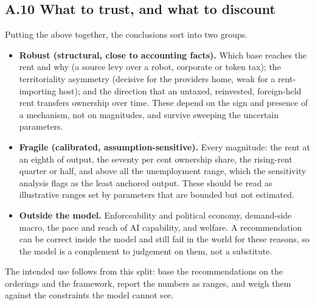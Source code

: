 \documentclass[12pt]{article}
\providecommand{\tightlist}{\setlength{\itemsep}{0pt}\setlength{\parskip}{0pt}}
\begin{document}
\hypertarget{a.10-what-to-trust-and-what-to-discount}{%
\subsection{A.10 What to trust, and what to
discount}\label{a.10-what-to-trust-and-what-to-discount}}

Putting the above together, the conclusions sort into two groups.

\begin{itemize}
\tightlist
\item
  \textbf{Robust (structural, close to accounting facts).} Which base
  reaches the rent and why (a source levy over a robot, corporate or
  token tax); the territoriality asymmetry (decisive for the
  provider\textquotesingle s home, weak for a rent-importing host); and
  the direction that an untaxed, reinvested, foreign-held rent transfers
  ownership over time. These depend on the sign and presence of a
  mechanism, not on magnitudes, and survive sweeping the uncertain
  parameters.
\item
  \textbf{Fragile (calibrated, assumption-sensitive).} Every magnitude:
  the rent at an eighth of output, the seventy per cent ownership share,
  the rising-rent quarter or half, and above all the unemployment range,
  which the sensitivity analysis flags as the least anchored output.
  These should be read as illustrative ranges set by parameters that are
  bounded but not estimated.
\item
  \textbf{Outside the model.} Enforceability and political economy,
  demand-side macro, the pace and reach of AI capability, and welfare. A
  recommendation can be correct inside the model and still fail in the
  world for these reasons, so the model is a complement to judgement on
  them, not a substitute.
\end{itemize}

The intended use follows from this split: base the recommendations on
the orderings and the framework, report the numbers as ranges, and weigh
them against the constraints the model cannot see.
\end{document}
